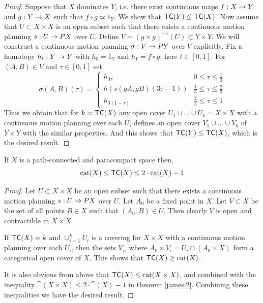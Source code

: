 \begin{proof}
    Suppose that $X$ dominates $Y$, i.e. there exist continuous maps $f: X \rightarrow Y$ and $g: Y \rightarrow X$ such that $f \circ g \simeq 1_Y$. We show that $\textsf{TC}(Y) \le \textsf{TC}(X)$. 
    Now assume that $U \subset X \times X$ is an open subset such that there exists a continuous motion planning $s : U \rightarrow PX$ over $U$. Define $V = (g \times g)^{-1}(U) \subset Y \times Y$. 
    We will construct a continuous motion planning $\sigma: V \rightarrow PY$ over $V$ explicitly. 
    Fix a homotopy $h_t: Y \rightarrow Y$ with $h_0 = 1_Y$ and $h_1 = f \circ g$; here $t \in [0,1]$. For $(A,B) \in V$ and $\tau \in [0,1]$ set
    \[
        \sigma(A,B)(\tau) = \begin{cases}
            h_{3\tau}               & 0 \le \tau \le \frac13       \\
            h(s(gA, gB)(3\tau - 1)) & \frac13 \le \tau \le \frac23 \\
            h_{3(1 - \tau)}         & \frac23 \le \tau \le 1
        \end{cases}
    \]
    Thus we obtain that for $k = \textsf{TC}(X)$ any open cover $U_1 \cup \ldots \cup U_k = X \times X$ with a continuous motion planning over each $U_i$ defines an open cover $V_1 \cup \ldots \cup V_k$ of $Y \times Y$ with the similar properties. 
    And this shows that $\textsf{TC}(Y) \le \textsf{TC}(X)$, which is the desired result.
\end{proof}

\begin{thm}\label{upper:bound:lemma}
    If $X$ is a path-connected and paracompact space then,
    \[
        \operatorname{cat}(X) \le \textsf{TC}(X) \le 2 \cdot \operatorname{cat}(X) - 1
    \]
\end{thm}

\begin{proof}
    Let $U \subset X \times X$ be an open subset such that there exists a continuous motion planning $s: U \rightarrow PX$ over $U$. 
    Let $A_0$ be a fixed point in $X$. 
    Let $V \subset X$ be the set of all points $B \in X$ such that $(A_0, B) \in U$. 
    Then clearly $V$ is open and contractible in $X \times X$.

    If $\textsf{TC}(X) = k$ and $\cup_{i=1}^{k}U_i$ is a covering for $X \times X$ with a continuous motion planning over each $U_i$, then the sets $V_i$, where $A_0 \times V_i = U_i \cap (A_0 \times X)$ form a categorical open cover of $X$. 
    This shows that $\textsf{TC}(X) \ge \operatorname{cat}(X)$.

    It is also obvious from above that $\textsf{TC}(X) \le \operatorname{cat}(X \times X)$, and combined with the inequality $\cat(X \times X) \le 2 \cdot \cat(X) - 1$ in theorem \ref{james:2}. 
    Combining these inequalities we have the desired result.
\end{proof}

